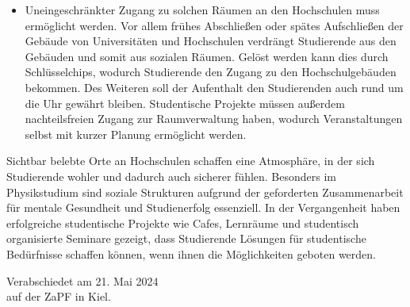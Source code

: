 \documentclass[DIV=calc]{scrartcl}
\begin{document}
\begin{itemize}
    \item Uneingeschränkter Zugang zu solchen Räumen an den Hochschulen muss ermöglicht werden. Vor allem frühes Abschließen oder spätes Aufschließen der Gebäude von Universitäten und Hochschulen verdrängt Studierende aus den Gebäuden und somit aus sozialen Räumen. Gelöst werden kann dies durch Schlüsselchips, wodurch Studierende den Zugang zu den Hochschulgebäuden bekommen. Des Weiteren soll der Aufenthalt den Studierenden auch rund um die Uhr gewährt bleiben. Studentische Projekte müssen außerdem nachteilsfreien Zugang zur Raumverwaltung haben, wodurch Veranstaltungen selbst mit kurzer Planung ermöglicht werden.
\end{itemize}

Sichtbar belebte Orte an Hochschulen schaffen eine Atmosphäre, in der sich Studierende wohler und dadurch auch sicherer fühlen. Besonders im Physikstudium sind soziale Strukturen aufgrund der geforderten Zusammenarbeit für mentale Gesundheit und Studienerfolg essenziell.
In der Vergangenheit haben erfolgreiche studentische Projekte wie Cafes, Lernräume und studentisch organisierte Seminare gezeigt, dass Studierende Lösungen für studentische Bedürfnisse schaffen können, wenn ihnen die Möglichkeiten geboten werden.


%
\vfill
\begin{flushright}
	Verabschiedet am 21. Mai 2024 \\
	auf der ZaPF in Kiel.
\end{flushright}
\end{document}
